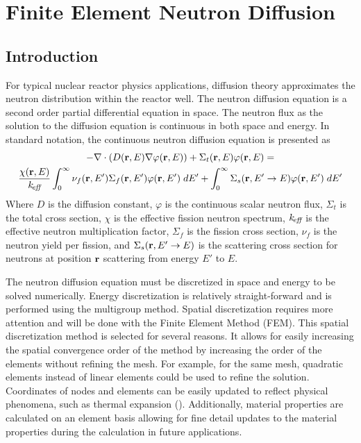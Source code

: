\chapter{Finite Element Neutron Diffusion}
\label{ch:neutronDiffusion}

\section{Introduction}
  For typical nuclear reactor physics applications, diffusion theory
  approximates the neutron distribution within the reactor well. The neutron 
  diffusion equation is a second order partial differential equation in space.
  The neutron flux as the solution to the diffusion equation is continuous in
  both space and energy. In standard notation, the continuous neutron diffusion
  equation is presented as
  \begin{multline}\label{eq:continuous_diffusion}
    -\mathbf{\nabla} \cdot (D(\mathbf{r},E) \mathbf{\nabla} \varphi(\mathbf{r},E)) + \Sigma_t(\mathbf{r},E) 
      \varphi(\mathbf{r},E) = \\
      \frac{\chi(\mathbf{r},E)}{k_{\!\mbox{\scriptsize \em eff}}} \int_0^{\infty} \nu_f(\mathbf{r},E') \Sigma_f(\mathbf{r},E') 
      \varphi(\mathbf{r},E') \; dE' + \int_0^{\infty} \Sigma_s(\mathbf{r},E' \rightarrow E) 
      \varphi(\mathbf{r},E') \; dE'
  \end{multline}
  Where $D$ is the diffusion constant, $\varphi$ is the continuous scalar 
  neutron flux, $\Sigma_t$ is the total cross section, $\chi$ is the effective 
  fission neutron spectrum, $k_{\!\mbox{\scriptsize \em eff}}$ is the effective neutron multiplication 
  factor, $\Sigma_f$ is the fission cross section, $\nu_f$ is the neutron yield 
  per fission, and $\Sigma_s(\mathbf{r},E' \rightarrow E)$ is the scattering cross 
  section for neutrons at position $\mathbf{r}$ scattering from energy $E'$ to $E$.
  
  The neutron diffusion equation must be discretized in space and 
  energy to be solved numerically. Energy discretization is relatively 
  straight-forward and is performed using the multigroup method. Spatial 
  discretization requires more attention and will be done with the Finite 
  Element Method (FEM). This spatial discretization method is selected for 
  several reasons. It allows for easily increasing the spatial convergence order
  of the method by increasing the order of the elements without refining the
  mesh. For example, for the same mesh, quadratic elements instead of linear
  elements could be used to refine the solution. Coordinates of nodes and 
  elements can be easily updated to reflect physical phenomena, such as thermal 
  expansion (). Additionally, material properties are 
  calculated on an element basis allowing for fine detail updates to the 
  material properties during the calculation in future applications.
  
